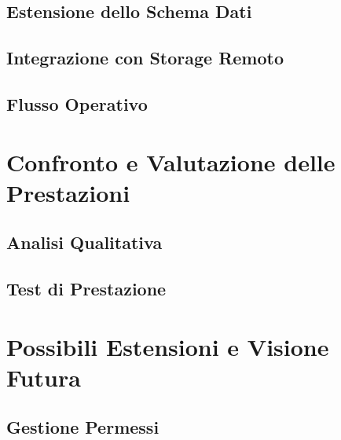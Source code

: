\documentclass[12pt,a4paper]{report}
\begin{document}
\section{Estensione dello Schema Dati}

\section{Integrazione con Storage Remoto}

\section{Flusso Operativo}

\chapter{Confronto e Valutazione delle Prestazioni}
\label{cap:confronto}

\section{Analisi Qualitativa}

\section{Test di Prestazione}

\chapter{Possibili Estensioni e Visione Futura}
\label{cap:estensioni}

\section{Gestione Permessi}
\end{document}
